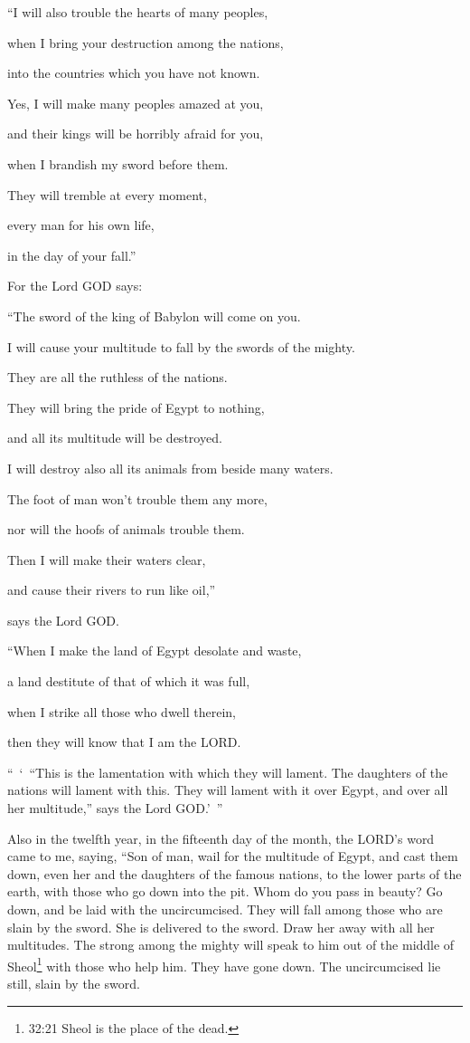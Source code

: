 \myverse{}“I will also trouble the hearts of many peoples,

when I bring your destruction among the nations,

into the countries which you have not known.

\myverse{}Yes, I will make many peoples amazed at you,

and their kings will be horribly afraid for you,

when I brandish my sword before them.

They will tremble at every moment,

every man for his own life,

in the day of your fall.”

\myverse{}For the Lord GOD says:

“The sword of the king of Babylon will come on you.

\myverse{}I will cause your multitude to fall by the swords of the mighty.

They are all the ruthless of the nations.

They will bring the pride of Egypt to nothing,

and all its multitude will be destroyed.

\myverse{}I will destroy also all its animals from beside many waters.

The foot of man won’t trouble them any more,

nor will the hoofs of animals trouble them.

\myverse{}Then I will make their waters clear,

and cause their rivers to run like oil,”

says the Lord GOD.

\myverse{}“When I make the land of Egypt desolate and waste,

a land destitute of that of which it was full,

when I strike all those who dwell therein,

then they will know that I am the LORD.

\myverse{}“ ‘ “This is the lamentation with which they will lament. The
daughters of the nations will lament with this. They will lament with it over Egypt, and over all her
multitude,” says the Lord GOD.’ ”


\vspace{\baselineskip} \myverse{}Also in the twelfth year, in the fifteenth day of the month,
the LORD’s word came to me, saying,
\myverse{}“Son of man, wail for the multitude of Egypt, and cast them down, even her
and the daughters of the famous nations, to the lower parts of the earth, with those who go down into
the pit.
\myverse{}Whom do you pass in beauty? Go down, and be laid with the uncircumcised.
\myverse{}They will fall among those who are slain by the sword. She is delivered to
the sword. Draw her away with all her multitudes.
\myverse{}The strong among the mighty will speak to him out of the middle of Sheol\footnote{32:21 Sheol is the place of the dead.} with those who help him. They have gone down. The uncircumcised
lie still, slain by the sword.

